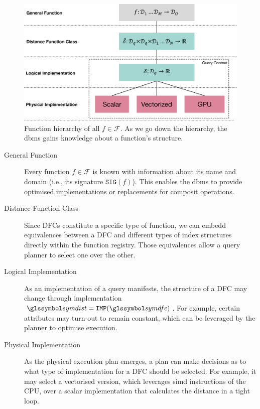 \begin{figure}[bt]
    \centering
    \includegraphics[width=\textwidth]{figures/function_hierarchy.eps}
    \caption{Function hierarchy of all $f \in \mathcal{F}$. As we go down the hierarchy, the \acrshort{dbms} gains knowledge about a function's structure.}
    \label{figure:function_hierarchy}
\end{figure}

\begin{description}
    \item[General Function] Every function $f \in \mathcal{F}$ is known with information about its name and domain (i.e., its signature $\mathtt{SIG}(f)$). This enables the \acrshort{dbms} to provide optimised implementations or replacements for composit operations.
    \item[Distance Function Class] Since DFCs constitute a specific type of function, we can embedd equivalences between a DFC and different types of index structures directly within the function registry. Those equivalences allow a query planner to select one over the other.
    \item[Logical Implementation] As an implementation of a query manifests, the structure of a DFC may change through implementation $\symdist = \mathtt{IMP}(\symdfc)$. For example, certain attributes may turn-out to remain constant, which can be leveraged by the planner to optimise execution.
    \item[Physical Implementation] As the physical execution plan emerges, a plan can make decisions as to what type of implementation for a DFC should be selected. For example, it may select a vectorised version, which leverages \acrshort{simd} instructions of the CPU, over a scalar implementation that calculates the distance in a tight loop.
\end{description}

